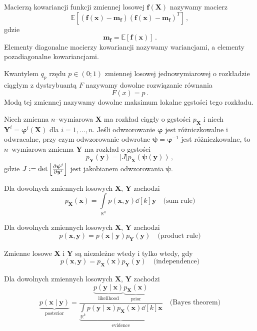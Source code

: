 \documentclass{myclass}
\numberwithin{equation}{subsection}
\begin{document}
\begin{definition}
Macierzą kowariancji funkcji zmiennej losowej \(\bm{f}(\bm{X})\) nazywamy macierz
\[
\mathbb{E}\left[(\bm{f}(\bm{x}) - \bm{m_f})(\bm{f}(\bm{x}) - \bm{m_f})^T\right]\,,
\]
gdzie
\[
\bm{m_f} = \mathbb{E}\left[\bm{f}(\bm{x})\right]\,.
\]
Elementy diagonalne macierzy kowariancji nazywamy wariancjami, a elementy pozadiagonalne
kowariancjami.
\end{definition}

\begin{definition}
Kwantylem \(q_p\) rzędu \(p \in (0;1)\) zmiennej losowej jednowymiarowej o rozkładzie ciągłym z
dystrybuantą \(F\) nazywamy dowolne rozwiązanie równania
\[
F(x) = p\,.
\]
Modą tej zmiennej nazywamy dowolne maksimum lokalne gęstości tego rozkładu.
\end{definition}

\begin{theorem}
Niech zmienna \(n\)--wymiarowa \(\bm{X}\) ma rozkład ciągły o gęstości \(p_{\bm{X}}\) i niech
\(\bm{Y}^i = \bm{\varphi}^i(\bm{X})\) dla \(i=1,\ldots,n\). Jeśli odwzorowanie \(\bm{\varphi}\) jest
różniczkowalne i odwracalne, przy czym odwzorowanie odwrotne \(\bm{\psi} = \bm{\varphi}^{-1}\) jest
różniczkowalne, to \(n\)--wymiarowa zmienna \(\bm{Y}\) ma rozkład o gęstości
\[
p_{\bm{Y}}(\bm{y}) = |J| p_{\bm{X}}(\bm{\psi}(\bm{y}))\,,
\]
gdzie \(J := \det \left[\pdv{\bm{\psi}^j}{\bm{y}^i}\right]\) jest jakobianem odwzorowania
\(\bm{\psi}\).
\end{theorem}

\begin{theorem}
Dla dowolnych zmiennych losowych \(\bm{X}\), \(\bm{Y}\) zachodzi
\[
p_{\bm{X}} (\bm{x}) = \int\limits_{\mathbb{R}^k} p(\bm{x}, \bm{y}) \dd[k]{\bm{y}}\quad\text{(sum rule)}
\]
\end{theorem}

\begin{theorem}
Dla dowolnych zmiennych losowych \(\bm{X}\), \(\bm{Y}\) zachodzi
\[
p(\bm{x}, \bm{y}) = p(\bm{x} \mid \bm{y}) p_{\bm{Y}}(\bm{y})\quad\text{(product rule)}
\]
\end{theorem}

\begin{theorem}
Zmienne losowe \(\bm{X}\) i \(\bm{Y}\) są niezależne wtedy i tylko wtedy, gdy
\[
p(\bm{x}, \bm{y}) = p_{\bm{X}}(\bm{x}) p_{\bm{Y}}(\bm{y})\quad\text{(independence)}
\]    
\end{theorem}

\begin{theorem}
Dla dowolnych zmiennych losowych \(\bm{X}\), \(\bm{Y}\) zachodzi    
\[
\underbrace{p(\bm{x} \mid \bm{y})}_\text{posterior} = \frac{\underbrace{p(\bm{y} \mid \bm{x})}_\text{likelihood} \underbrace{p_{\bm{X}}(\bm{x})}_\text{prior}}{ \underbrace{\int\limits_{\mathbb{R}^k} p(\bm{y} \mid \bm{x}) p_{\bm{X}}(\bm{x}) \dd[k]{\bm{x}}}_\text{evidence} }\quad\text{(Bayes theorem)}
\]    
\end{theorem}
\end{document}
